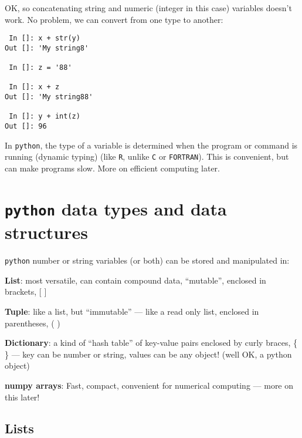 OK, so concatenating string and numeric (integer in this case) 
variables doesn't work.  No problem, we can convert from one type to 
another:

\begin{lstlisting}
 In []: x + str(y)
Out []: 'My string8'

 In []: z = '88'

 In []: x + z
Out []: 'My string88'

 In []: y + int(z)
Out []: 96
 \end{lstlisting} 

\begin{tipbox}
In {\tt python}, the type of a variable is determined when the  program 
or command is running (dynamic typing) (like {\tt R}, unlike {\tt C} or 
{\tt FORTRAN}). This is convenient, but can make programs slow. More 
on efficient computing later.
\end{tipbox}

\section{{\tt python} data types and data structures}

{\tt python} number or string variables (or both) can be stored and manipulated in:
\begin{compactitem} \itemsep4pt
 \item  {\bf List}: most versatile, can contain compound data, ``mutable'',
enclosed in brackets, [ ]
 \item  {\bf Tuple}: like a list, but ``immutable'' --- like a read only list,
enclosed in parentheses,  ( ) 
 \item  {\bf Dictionary}: a kind of ``hash table'' of key-value pairs enclosed
by curly braces, \{ \} --- key can be number or string, values can be any
object! (well OK, a python object)
 \item  {\bf numpy arrays}: Fast, compact, convenient for numerical computing --- more on this later!
\end{compactitem}

\subsection{Lists}

